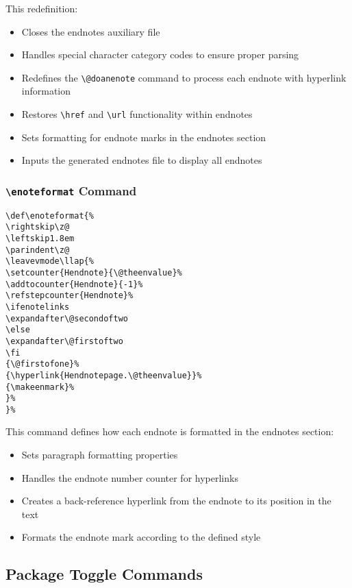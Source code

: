\documentclass[11pt]{article}
\newcommand{\cmd}[1]{\texttt{\textbackslash#1}}
\begin{document}
This redefinition:
\begin{itemize}
  \item Closes the endnotes auxiliary file
  \item Handles special character category codes to ensure proper parsing
  \item Redefines the \cmd{@doanenote} command to process each endnote with hyperlink information
  \item Restores \cmd{href} and \cmd{url} functionality within endnotes
  \item Sets formatting for endnote marks in the endnotes section
  \item Inputs the generated endnotes file to display all endnotes
\end{itemize}

\subsubsection{\cmd{enoteformat} Command}

\begin{tcolorbox}[colback=gray!5, colframe=gray!75, title=enoteformat Redefinition]
\begin{lstlisting}
\def\enoteformat{%
\rightskip\z@
\leftskip1.8em
\parindent\z@
\leavevmode\llap{%
\setcounter{Hendnote}{\@theenvalue}%
\addtocounter{Hendnote}{-1}%
\refstepcounter{Hendnote}%
\ifenotelinks
\expandafter\@secondoftwo
\else
\expandafter\@firstoftwo
\fi
{\@firstofone}%
{\hyperlink{Hendnotepage.\@theenvalue}}%
{\makeenmark}%
}%
}%
\end{lstlisting}
\end{tcolorbox}

This command defines how each endnote is formatted in the endnotes section:
\begin{itemize}
  \item Sets paragraph formatting properties
  \item Handles the endnote number counter for hyperlinks
  \item Creates a back-reference hyperlink from the endnote to its position in the text
  \item Formats the endnote mark according to the defined style
\end{itemize}

\subsection{Package Toggle Commands}
\end{document}
